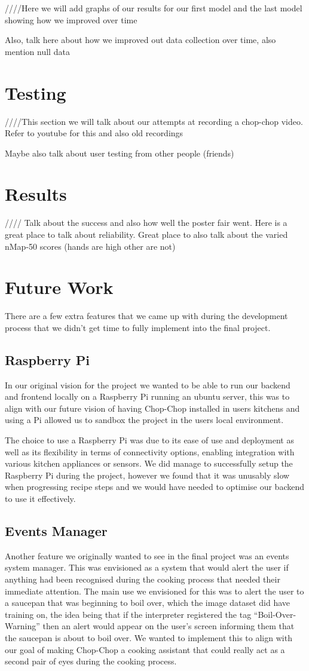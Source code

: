 \documentclass{article}
\begin{document}
////Here we will add graphs of our results for our first model and the last model showing how we improved over time

Also, talk here about how we improved out data collection over time, also mention null data


\section{Testing}
////This section we will talk about our attempts at recording a chop-chop video. Refer to youtube for this and also old recordings

Maybe also talk about user testing from other people (friends)

\section{Results}
//// Talk about the success and also how well the poster fair went. Here is a great place to talk about reliability. Great place to also talk about the varied nMap-50 scores (hands are high other are not)

\section{Future Work}
There are a few extra features that we came up with during the development process that we didn’t get time to fully implement into the final project.
\subsection{Raspberry Pi}
In our original vision for the project we wanted to be able to run our backend and frontend locally on a Raspberry Pi running an ubuntu server, this was to align with our future vision of having Chop-Chop installed in users kitchens and using a Pi allowed us to sandbox the project in the users local environment.

The choice to use a Raspberry Pi was due to its ease of use and deployment as well as its flexibility in terms of connectivity options, enabling integration with various kitchen appliances or sensors. We did manage to successfully setup the Raspberry Pi during the project, however we found that it was unusably slow when progressing recipe steps and we would have needed to optimise our backend to use it effectively.
\subsection{Events Manager}
Another feature we originally wanted to see in the final project was an events system manager. This was envisioned as a system that would alert the user if anything had been recognised during the cooking process that needed their immediate attention. The main use we envisioned for this was to alert the user to a saucepan that was beginning to boil over, which the image dataset did have training on, the idea being that if the interpreter registered the tag “Boil-Over-Warning” then an alert would appear on the user’s screen informing them that the saucepan is about to boil over. We wanted to implement this to align with our goal of making Chop-Chop a cooking assistant that could really act as a second pair of eyes during the cooking process.
\end{document}

